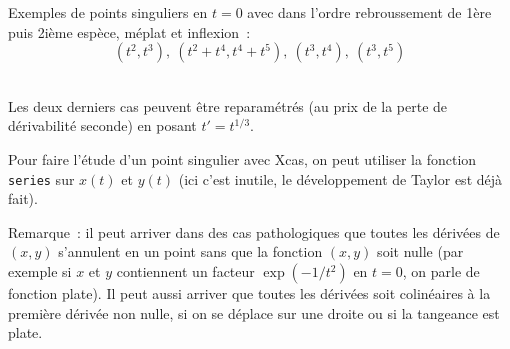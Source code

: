 \documentclass[a4paper,11pt]{article}
\begin{document}
\begin{giacjshere}
Exemples de points singuliers en $t=0$ avec dans l'ordre rebroussement
de 1\`ere puis 2i\`eme esp\`ece, m\'eplat et inflexion~: 
$$ (t^2,t^3), \ (t^2+t^4,t^4+t^5), \ (t^3,t^4), \ (t^3,t^5) $$\\



Les deux derniers cas peuvent \^etre reparam\'etr\'es (au prix
de la perte de d\'erivabilit\'e seconde) en posant $t'=t^{1/3}$.

Pour faire l'\'etude d'un point singulier avec Xcas, on peut utiliser
la fonction \verb|series| sur $x(t)$ et $y(t)$ (ici c'est inutile,
le d\'eveloppement de Taylor est d\'ej\`a fait).

Remarque~: il peut arriver dans des cas pathologiques
que toutes les d\'eriv\'ees de $(x,y)$ s'annulent en
un point sans que la fonction $(x,y)$ soit nulle (par exemple si $x$
et $y$ contiennent un facteur $\exp(-1/t^2)$ en $t=0$, on parle
de fonction plate). Il peut aussi
arriver que toutes les d\'eriv\'ees soit colin\'eaires \`a la
premi\`ere d\'eriv\'ee non nulle, si on se d\'eplace sur une droite
ou si la tangeance est plate.


\end{giacjshere}
\end{document}
